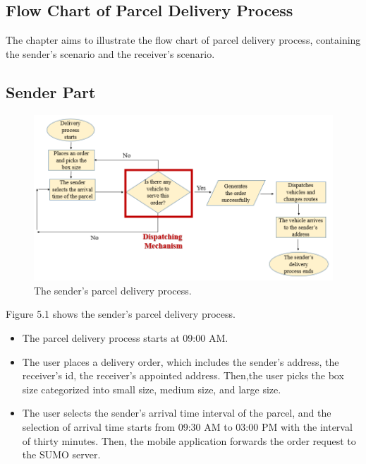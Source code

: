 \documentclass[12pt]{ksthesis}
\begin{document}
\begin{thesis}
{\chapter{Flow Chart of Parcel Delivery Process}\label{Chap:Flow Chart of Parcel Delivery Process}

The chapter aims to illustrate the flow chart of parcel delivery process, containing the sender’s scenario and the receiver’s scenario.

\section{Sender Part}

\begin{figure}[H]
\centering
\includegraphics[scale=0.65]{./Thesis_figures/F5-1_sender_delivery_process.PNG}
\caption{\large The sender’s parcel delivery process.}
\vspace{0.5cm}
\label{Fig:sender_process}
\end{figure}

Figure 5.1 shows the sender’s parcel delivery process.


\begin{itemize}
\item
The parcel delivery process starts at 09:00 AM.

\item
The user places a delivery order, which includes the sender’s address, the receiver’s id, the receiver’s appointed address. Then,the user picks the box size categorized into small size, medium size, and large size.


\item
The user selects the sender’s arrival time interval of the parcel, and the selection of arrival time starts from 09:30 AM to 03:00 PM with the interval of thirty minutes. Then, the mobile application forwards the order request to the SUMO server.


\end{itemize}}
\end{thesis}
\end{document}
